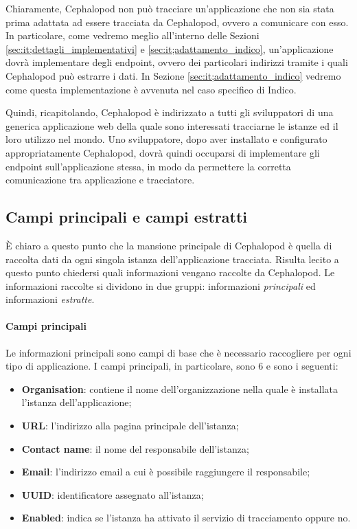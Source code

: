             Chiaramente, Cephalopod non può tracciare un'applicazione che non sia stata prima adattata ad essere tracciata da Cephalopod, ovvero a comunicare con esso. In particolare, come vedremo meglio all'interno delle Sezioni \ref{sec:it;dettagli_implementativi} e \ref{sec:it;adattamento_indico}, un'applicazione dovrà implementare degli endpoint, ovvero dei particolari indirizzi tramite i quali Cephalopod può estrarre i dati. In Sezione \ref{sec:it;adattamento_indico} vedremo come questa implementazione è avvenuta nel caso specifico di Indico.
            
            Quindi, ricapitolando, Cephalopod è indirizzato a tutti gli sviluppatori di una generica applicazione web della quale sono interessati tracciarne le istanze ed il loro utilizzo nel mondo. Uno sviluppatore, dopo aver installato e configurato appropriatamente Cephalopod, dovrà quindi occuparsi di implementare gli endpoint sull'applicazione stessa, in modo da permettere la corretta comunicazione tra applicazione e tracciatore.
            
        \subsection{Campi principali e campi estratti} \label{subsec:it;cp;campi_principali_campi_estratti}
        
            È chiaro a questo punto che la mansione principale di Cephalopod è quella di raccolta dati da ogni singola istanza dell'applicazione tracciata. Risulta lecito a questo punto chiedersi quali informazioni vengano raccolte da Cephalopod.
            Le informazioni raccolte si dividono in due gruppi: informazioni \textit{principali} ed informazioni \textit{estratte}.
            
            \paragraph{Campi principali}Le informazioni principali sono campi di base che è necessario raccogliere per ogni tipo di applicazione. I campi principali, in particolare, sono 6 e sono i seguenti:
            
            \begin{itemize}
                \item \textbf{Organisation}: contiene il nome dell'organizzazione nella quale è installata l'istanza dell'applicazione;
                \item \textbf{URL}: l'indirizzo alla pagina principale dell'istanza;
                \item \textbf{Contact name}: il nome del responsabile dell'istanza;
                \item \textbf{Email}: l'indirizzo email a cui è possibile raggiungere il responsabile;
                \item \textbf{UUID}: identificatore  assegnato all'istanza;
                \item \textbf{Enabled}: indica se l'istanza ha attivato il servizio di tracciamento oppure no.
            \end{itemize}
            
